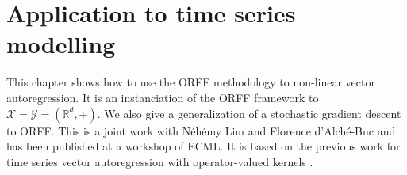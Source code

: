 \chapter{Application to time series modelling} %
\label{ch:applications}
\bigskip
\begin{justify}
This chapter shows how to use the \acs{ORFF} methodology to non-linear vector
autoregression. It is an instanciation of the \acs{ORFF} framework to
$\mathcal{X}=\mathcal{Y}=(\mathbb{R}^d, +)$. We also give a generalization of a
stochastic gradient descent \citep{dai2014scalable} to \acs{ORFF}. This is a
joint work with N\'eh\'emy Lim and Florence d'Alch\'e-Buc and has been
published at a workshop of \acs{ECML}. It is based on the previous work
\citet{Lim2015} for time series vector autoregression with operator-valued
kernels \cite{brault2016scaling}.
\end{justify}
\minitoc

